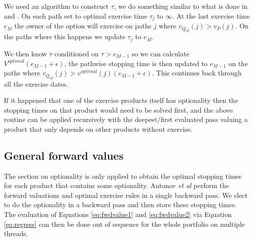 \documentclass[a4paper,10pt]{article}
\begin{document}
We need an algorithm to construct $\tau$, we do something similar to what is done in \cite{cesari2010modelling} and \cite{AntonovEtAl2015}.  On each path set to optimal exercise time $\tau_j$ to $\infty$.  At the last exercise time $e_M$ the owner of the option will exercise on paths $j$ where $v_{Q_M}(j)>v_P(j)$.  On the paths where this happens we update $\tau_j$ to $e_M$.

We then know $\tau$ conditioned on $\tau>e_{M-1}$ so we can calculate $V^{optimal}(e_{M-1}+\epsilon)$, the pathwise stopping time is then updated to $e_{M-1}$ on the paths where $v_{Q_M}(j) > v^{optimal}(j)(e_{M-1}+\epsilon)$.  This continues back through all the exercise dates.

If it happened that one of the exercise products itself has optionality then the stopping times on that product would need to be solved first, and the above routine can be applied recursively with the deepest/first evaluated pass valuing a product that only depends on other products without exercise.

\subsection{General forward values}
The section on optionality is only applied to obtain the optimal stopping times for each product that contains some optionality.  Antonov \textit{et al} \cite{AntonovEtAl2015} perform the forward valuations and optimal exercise rules in a single backward pass.  We elect to do the optionality in a backward pass and then store these stopping times.  The evaluation of Equations \ref{eq:fwdvalue1} and \ref{eq:fwdvalue2} via Equation \ref{eq:regress} can then be done out of sequence for the whole portfolio on multiple threads.


\end{document}
